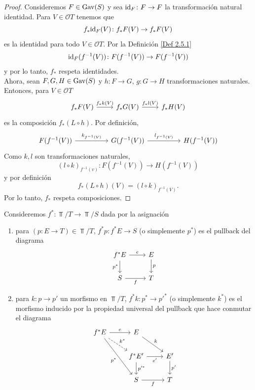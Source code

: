 \begin{proof}
Consideremos $F\in {\mathrm{Gav}}(S)$ y sea ${\mathrm{id}}_F\colon F\to F$ la transformación natural identidad. Para $V\in \mathcal{O}T$
tenemos que 
\[
f_*{\mathrm{id}}_F(V)\colon f_*F(V)\to f_*F(V)
\]
es la identidad para todo $V\in \mathcal{O}T$. Por la Definición \ref{Def 2.5.1}
\[
{\mathrm{id}}_F(f^{-1}(V))\colon F(f^{-1}(V))\to F(f^{-1}(V))
\]
y por lo tanto, $f_*$ respeta identidades.\\

Ahora, sean $F, G, H\in {\mathrm{Gav}}(S)$ y $h\colon F\to G$, $g\colon G\to H$ transformaciones naturales. Entonces, para $V\in \mathcal{O}T$
\[\begin{tikzcd}
	{f_*F(V)} & {f_*G(V)} & {f_*H(V)}
	\arrow["{f_*k(V)}", from=1-1, to=1-2]
	\arrow["{f_*l(V)}", from=1-2, to=1-3]
\end{tikzcd}\]
es la composición $f_*(L\circ h)$. Por definición, 
\[\begin{tikzcd}
	{F(f^{-1}(V))} && {G(f^{-1}(V))} && {H(f^{-1}(V))}
	\arrow["{k_{f^{-1}(V)}}", from=1-1, to=1-3]
	\arrow["{l_{f^{-1}(V)}}", from=1-3, to=1-5]
\end{tikzcd}\]
Como $k, l$ son transformaciones naturales, 
\[
(l\circ k)_{f^{-1}(v)}\colon F(f^{-1}(V))\to H(f^{-1}(V))
\]
y por definición 
\[
f_*(L\circ h)(V)= (l\circ k)_{f^{-1}(V)}.
\]
Por lo tanto, $f_*$ respeta composiciones.
\end{proof}

\begin{definition}\label{Def 2.5.4}
Consideremos $f^*\colon \Top/T\to \Top/S$ dada por la asignación 
\begin{enumerate}
    \item para $(p\colon E\to T)\in \Top/T$, $f^*p\colon f^*E\to S$ (o simplemente $p^*$) es el pullback del diagrama
    \[\begin{tikzcd}
	{f^*E} & E \\
	S & T
	\arrow["e", from=1-1, to=1-2]
	\arrow["{p^*}"', from=1-1, to=2-1]
	\arrow["p", from=1-2, to=2-2]
	\arrow["f"', from=2-1, to=2-2]
    \end{tikzcd}\]
    \item para $k\colon p\to p'$ un morfismo en $\Top/T$, $f^*k\colon p^*\to p'^*$ (o simplemente $k^*$) es el morfismo 
    inducido por la propiedad universal del pullback que hace conmutar el diagrama
    \[\begin{tikzcd}
	{f^*E} & E \\
	& {f^*E'} & {E'} \\
	& S & T
	\arrow["e", from=1-1, to=1-2]
	\arrow["{k^*}", dashed, from=1-1, to=2-2]
	\arrow["{p^*}"', from=1-1, to=3-2]
	\arrow["k", from=1-2, to=2-3]
	\arrow["{e'}"', from=2-2, to=2-3]
	\arrow["{p'^*}", from=2-2, to=3-2]
	\arrow["{p'}", from=2-3, to=3-3]
	\arrow["f"', from=3-2, to=3-3]
    \end{tikzcd}\]
\end{enumerate}
\end{definition}

